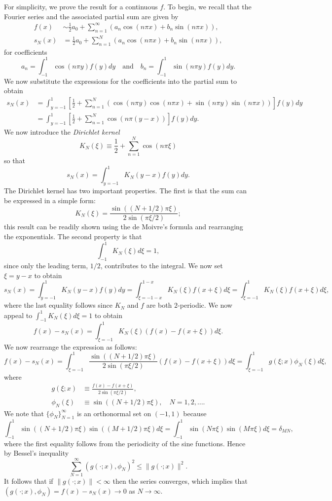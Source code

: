 For simplicity, we prove the result for a continuous $f$. To begin, we recall that the Fourier series and the associated partial sum are given by
\begin{align*}
    f(x) &\sim \frac{1}{2} a_0 + \sum_{n=1}^{\infty} \left(a_n \cos(n\pi x) + b_n \sin(n\pi x)\right), \\
    s_N(x) &= \frac{1}{2} a_0 + \sum_{n=1}^{N} \left(a_n \cos(n\pi x) + b_n \sin(n\pi x)\right),
\end{align*}
for coefficients
\[a_n = \int_{-1}^{1} \cos(n\pi y) f(y) dy \quad \text{and} \quad b_n = \int_{-1}^{1} \sin(n\pi y) f(y) dy.\]
We now substitute the expressions for the coefficients into the partial sum to obtain
\begin{align*}
    s_N(x) &= \int_{y=-1}^{1} \left[\frac{1}{2} + \sum_{n=1}^{N} \left(\cos(n\pi y) \cos(n\pi x) + \sin(n\pi y) \sin(n\pi x)\right)\right] f(y) dy \\
    &= \int_{y=-1}^{1} \left[\frac{1}{2} + \sum_{n=1}^{N} \cos(n\pi(y - x))\right] f(y) dy.
\end{align*}
We now introduce the \textit{Dirichlet kernel}
\[K_N(\xi) \equiv \frac{1}{2} + \sum_{n=1}^{N} \cos(n\pi\xi)\]
so that
\[s_N(x) = \int_{y=-1}^{1} K_N(y - x) f(y) dy.\]
The Dirichlet kernel has two important properties. The first is that the sum can be expressed in a simple form:
\[K_N(\xi) = \frac{\sin((N + 1/2)\pi\xi)}{2 \sin(\pi\xi/2)};\]
this result can be readily shown using the de Moivre's formula and rearranging the exponentials. The second property is that
\[\int_{-1}^{1} K_N(\xi) d\xi = 1,\]
since only the leading term, $1/2$, contributes to the integral. We now set $\xi = y - x$ to obtain
\[s_N(x) = \int_{y=-1}^{1} K_N(y - x) f(y) dy = \int_{\xi=-1-x}^{1-x} K_N(\xi) f(x + \xi) d\xi = \int_{\xi=-1}^{1} K_N(\xi) f(x + \xi) d\xi,\]
where the last equality follows since $K_N$ and $f$ are both $2$-periodic. We now appeal to $\int_{-1}^{1} K_N(\xi) d\xi = 1$ to obtain
\[f(x) - s_N(x) = \int_{\xi=-1}^{1} K_N(\xi) (f(x) - f(x + \xi)) d\xi.\]
We now rearrange the expression as follows:
\[f(x) - s_N(x) = \int_{\xi=-1}^{1} \frac{\sin((N + 1/2)\pi\xi)}{2 \sin(\pi\xi/2)} (f(x) - f(x + \xi)) d\xi = \int_{\xi=-1}^{1} g(\xi; x) \phi_N(\xi) d\xi,\]
where
\begin{align*}
    g(\xi; x) &\equiv \frac{f(x) - f(x + \xi)}{2 \sin(\pi\xi/2)}, \\
    \phi_N(\xi) &\equiv \sin((N + 1/2)\pi\xi), \quad N = 1, 2, \dots.
\end{align*}
We note that $\{\phi_N\}_{N=1}^{\infty}$ is an orthonormal set on $(-1, 1)$ because
\[\int_{-1}^{1} \sin((N + 1/2)\pi\xi) \sin((M + 1/2)\pi\xi) d\xi = \int_{-1}^{1} \sin(N\pi\xi) \sin(M\pi\xi) d\xi = \delta_{MN},\]
where the first equality follows from the periodicity of the sine functions. Hence by Bessel's inequality
\[\sum_{N=1}^{\infty} (g(\cdot; x), \phi_N)^2 \leq \|g(\cdot; x)\|^2.\]
It follows that if $\|g(\cdot; x)\| < \infty$ then the series converges, which implies that $(g(\cdot; x), \phi_N) = f(x) - s_N(x) \to 0$ as $N \to \infty$.

